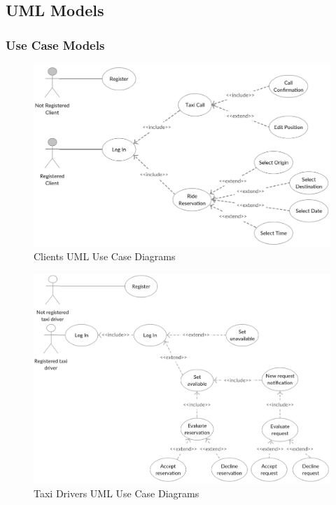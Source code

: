 \documentclass[a4paper]{article}
\begin{document}
\begin{enumerate}[label=\bfseries G\arabic*:]
\subsection{UML Models}


\subsubsection{Use Case Models}

\begin{figure}[H]
\includegraphics[width=\textwidth]{UseCase-Client}
\centering
\caption{Clients UML Use Case Diagrams}
\label{fig:usecaseclient}
\end{figure}

\begin{figure}[H]
\includegraphics[width=\textwidth]{UseCase-TaxiDriver}
\centering
\caption{Taxi Drivers UML Use Case Diagrams}
\label{fig:usecasetaxidriver}
\end{figure}


\end{enumerate}
\end{document}
